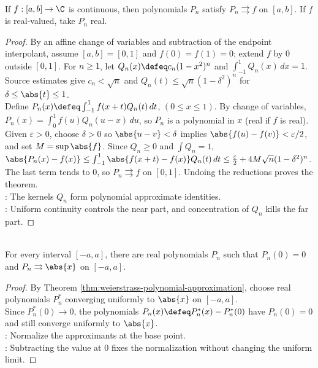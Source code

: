 \begin{theorem} \label{thm:weierstrass-polynomial-approximation}\label{thm:power-approx-fourier-main-source-todo} \\
If $f:[a,b]\to\C$ is continuous, then polynomials $P_n$ satisfy $P_n\rightrightarrows f$ on $[a,b]$. If $f$ is real-valued, take $P_n$ real.
\begin{proof}
By an affine change of variables and subtraction of the endpoint interpolant, assume $[a,b]=[0,1]$ and $f(0)=f(1)=0$; extend $f$ by $0$ outside $[0,1]$. For $n\geq1$, let $Q_n(x)\defeq c_n(1-x^2)^n$ and $\int_{-1}^{1}Q_n(x)\,dx=1$.\\
Source estimates give $c_n<\sqrt n$ and $Q_n(t)\leq\sqrt n(1-\delta^2)^n$ for $\delta\leq\abs{t}\leq1$.\\
Define $P_n(x)\defeq\int_{-1}^{1}f(x+t)Q_n(t)\,dt$, $(0\leq x\leq1)$. By change of variables, $P_n(x)=\int_0^1 f(u)Q_n(u-x)\,du$, so $P_n$ is a polynomial in $x$ (real if $f$ is real). Given $\varepsilon>0$, choose $\delta>0$ so $\abs{u-v}<\delta$ implies $\abs{f(u)-f(v)}<\varepsilon/2$, and set $M=\sup\abs{f}$. Since $Q_n\geq0$ and $\int Q_n=1$, $\abs{P_n(x)-f(x)} \leq \int_{-1}^{1}\abs{f(x+t)-f(x)}Q_n(t)\,dt \leq \frac{\varepsilon}{2}+4M\sqrt n(1-\delta^2)^n$.\\
The last term tends to $0$, so $P_n\rightrightarrows f$ on $[0,1]$. Undoing the reductions proves the theorem.\\
: The kernels $Q_n$ form polynomial approximate identities.\\
: Uniform continuity controls the near part, and concentration of $Q_n$ kills the far part.
\end{proof}
\end{theorem}

\begin{corollary} \label{cor:absolute-value-polynomial-approximation} \\
For every interval $[-a,a]$, there are real polynomials $P_n$ such that $P_n(0)=0$ and $P_n\rightrightarrows \abs{x}$ on $[-a,a]$.
\begin{proof}
By Theorem \ref{thm:weierstrass-polynomial-approximation}, choose real polynomials $P_n^\ast$ converging uniformly to $\abs{x}$ on $[-a,a]$.\\
Since $P_n^\ast(0)\to0$, the polynomials $P_n(x)\defeq P_n^\ast(x)-P_n^\ast(0)$ have $P_n(0)=0$ and still converge uniformly to $\abs{x}$.\\
: Normalize the approximants at the base point.\\
: Subtracting the value at $0$ fixes the normalization without changing the uniform limit.
\end{proof}
\end{corollary}

